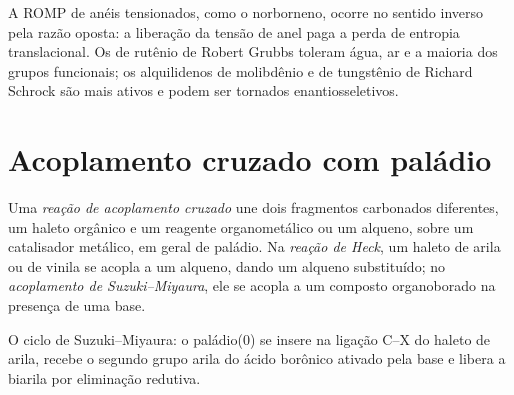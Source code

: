 A ROMP de anéis tensionados, como o norborneno, ocorre no sentido inverso pela razão
oposta: a liberação da tensão de anel paga a perda de entropia translacional.
Os  de rutênio de Robert Grubbs toleram água, ar e a maioria dos grupos
funcionais; os alquilidenos de molibdênio e de tungstênio de Richard Schrock são mais ativos
e podem ser tornados enantiosseletivos.

\section{Acoplamento cruzado com paládio}

\begin{definition}\label{def:b3:homogeneous-catalysis:cross-coupling}
Uma \emph{reação de acoplamento cruzado} une dois
fragmentos carbonados diferentes, um haleto orgânico e um reagente organometálico ou um
alqueno, sobre um catalisador metálico, em geral de paládio. Na \emph{reação de
Heck}, um haleto de arila ou de vinila se acopla a um alqueno,
dando um alqueno substituído; no \emph{acoplamento de
Suzuki--Miyaura}, ele se acopla a um composto
organoborado na presença de uma base.
\end{definition}

\begin{omfigure}

{\small O ciclo de Suzuki--Miyaura: o paládio(0) se insere na ligação C--X do
haleto de arila, recebe o segundo grupo arila do ácido borônico ativado pela
base e libera a biarila por eliminação redutiva.}
\end{omfigure}

